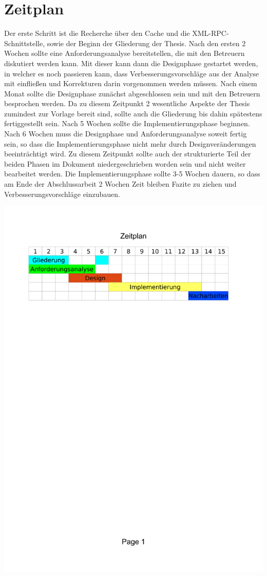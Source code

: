 \documentclass[a4paper,11pt]{article}
\begin{document}
\section{Zeitplan}
Der erste Schritt ist die Recherche über den Cache und die XML-RPC-Schnittstelle, sowie der Beginn der Gliederung
der Thesis.
Nach den ersten 2 Wochen sollte eine Anforderungsanalyse bereitstellen, die mit den Betreuern diskutiert werden kann.
Mit dieser kann dann die Designphase gestartet werden, in welcher es noch passieren kann, dass Verbesserungsvorschläge
aus der Analyse mit einfließen und Korrekturen darin vorgenommen werden müssen.
Nach einem Monat sollte die Designphase zunächst abgeschlossen sein und mit den Betreuern besprochen werden.
Da zu diesem Zeitpunkt 2 wesentliche Aspekte der Thesis zumindest zur Vorlage bereit sind, sollte auch die Gliederung
bis dahin spätestens fertiggestellt sein.
Nach 5 Wochen sollte die Implementierungsphase beginnen.
Nach 6 Wochen muss die Designphase und Anforderungsanalyse soweit fertig sein, so dass die Implementierungsphase
nicht mehr durch Designveränderungen beeinträchtigt wird.
Zu diesem Zeitpunkt sollte auch der strukturierte Teil der beiden Phasen im Dokument niedergeschrieben worden sein und
nicht weiter bearbeitet werden.
Die Implementierungsphase sollte 3-5 Wochen dauern, so dass am Ende der Abschlussarbeit 2 Wochen Zeit bleiben Fazite
zu ziehen und Verbesserungsvorschläge einzubauen.

\includegraphics[trim=2cm 22cm 2.5cm 3cm, clip=true, totalheight=0.18\textheight]{zeitplan.pdf}
\end{document}
